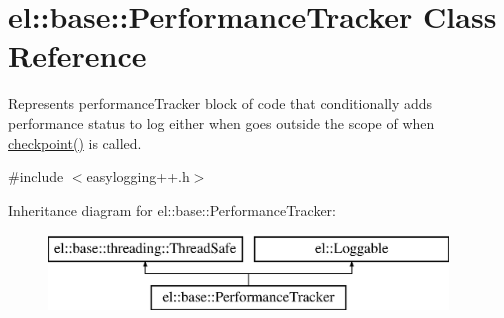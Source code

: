 \hypertarget{classel_1_1base_1_1_performance_tracker}{}\section{el\+:\+:base\+:\+:Performance\+Tracker Class Reference}
\label{classel_1_1base_1_1_performance_tracker}


Represents performance\+Tracker block of code that conditionally adds performance status to log either when goes outside the scope of when \hyperlink{classel_1_1base_1_1_performance_tracker_aec9a6e149674c5782cc855e49aeb0aaf}{checkpoint()} is called.  




{\ttfamily \#include $<$easylogging++.\+h$>$}

Inheritance diagram for el\+:\+:base\+:\+:Performance\+Tracker\+:\begin{figure}[H]
\begin{center}
\leavevmode
\includegraphics[height=2.000000cm]{classel_1_1base_1_1_performance_tracker}
\end{center}
\end{figure}

